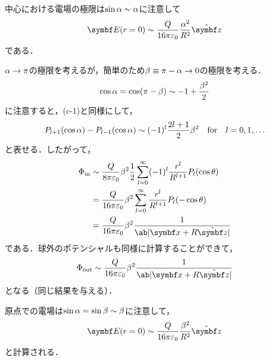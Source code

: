 中心における電場の極限は$\sin\alpha \sim \alpha$に注意して
\begin{gather}%
  \bs{E}(r = 0) \sim \frac{Q}{16\pi \eps_0}\frac{\al^2}{R^2} \hat{\bs{z}}
\end{gather}%
である．

$\alpha \to \pi$の極限を考えるが，簡単のため$\beta \equiv \pi - \alpha \to 0$の極限を考える．
\begin{gather}%
  \cos\al = \cos(\pi -\be) \sim -1 + \frac{\be^2}{2}
\end{gather}%
に注意すると，(c-1)と同様にして，
\begin{gather}%
  P_{l+1}(\cos\al) - P_{l-1}(\cos\al) \sim (-1)^l \frac{2l+1}{2} \be^2
  \qqtext{for} l = 0, 1, \ldots
\end{gather}%
と表せる．したがって，
\begin{align}%
  \Phi_{\text{in}} &\sim \frac{Q}{8\pi\eps_0} \be^2
  \frac{1}{2} \sum_{l=0}^\infty (-1)^l \frac{r^l}{R^{l+1}} P_l(\cos\theta)\notag\\
  &= \frac{Q}{16\pi\eps_0}\beta^2 \sum_{l=0}^\infty \frac{r^l}{R^{l+1}} P_l(-\cos\theta)\notag\\
  &= \frac{Q}{16\pi\eps_0} \beta^2 \frac{1}{\ab|\bs{x} + R \hat{\bs{z}}|}
\end{align}%
である．球外のポテンシャルも同様に計算することができて，
\begin{gather}%
  \Phi_{\text{out}} \sim \frac{Q}{16\pi\eps_0} \beta^2 \frac{1}{\ab|\bs{x} + R \hat{\bs{z}}|}
\end{gather}%
となる（同じ結果を与える）．

原点での電場は$\sin\alpha =\sin\beta \sim \beta$に注意して，
\begin{gather}%
  \bs{E}(r=0) \sim \frac{Q}{16\pi\eps_0} \frac{\be^2}{R^2} \hat{\bs{z}}
\end{gather}%
と計算される．

